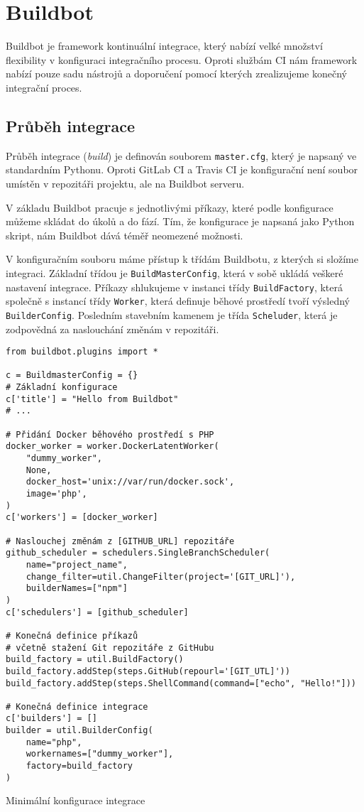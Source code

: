 \chapter{Buildbot}

Buildbot je framework kontinuální integrace, který nabízí velké množství flexibility v konfiguraci integračního procesu.
Oproti službám CI nám framework nabízí pouze sadu nástrojů a doporučení pomocí kterých zrealizujeme konečný integrační proces.

\section{Průběh integrace}

Průběh integrace (\textit{build}) je definován souborem \verb|master.cfg|, který je napsaný ve standardním Pythonu.
Oproti GitLab CI a Travis CI je konfigurační není soubor umístěn v repozitáři projektu, ale na Buildbot serveru.

V základu Buildbot pracuje s jednotlivými příkazy, které podle konfigurace můžeme skládat do úkolů a do fází.
Tím, že konfigurace je napsaná jako Python skript, nám Buildbot dává téměř neomezené možnosti.

V konfiguračním souboru máme přístup k třídám Buildbotu, z kterých si složíme integraci.
Základní třídou je \verb|BuildMasterConfig|, která v sobě ukládá veškeré nastavení integrace.
Příkazy shlukujeme v instanci třídy \verb|BuildFactory|, která společně s instancí třídy \verb|Worker|, která definuje běhové prostředí tvoří výsledný \verb|BuilderConfig|.
Posledním stavebním kamenem je třída \verb|Scheluder|, která je zodpovědná za naslouchání změnám v repozitáři.

\begin{listing}[ht]
\begin{verbatim}
from buildbot.plugins import *

c = BuildmasterConfig = {}
# Základní konfigurace
c['title'] = "Hello from Buildbot"
# ...

# Přidání Docker běhového prostředí s PHP
docker_worker = worker.DockerLatentWorker(
    "dummy_worker",
    None,
    docker_host='unix://var/run/docker.sock',
    image='php',
)
c['workers'] = [docker_worker]

# Naslouchej změnám z [GITHUB_URL] repozitáře
github_scheduler = schedulers.SingleBranchScheduler(
    name="project_name",
    change_filter=util.ChangeFilter(project='[GIT_URL]'),
    builderNames=["npm"]
)
c['schedulers'] = [github_scheduler]

# Konečná definice příkazů
# včetně stažení Git repozitáře z GitHubu
build_factory = util.BuildFactory()
build_factory.addStep(steps.GitHub(repourl='[GIT_UTL]'))
build_factory.addStep(steps.ShellCommand(command=["echo", "Hello!"]))

# Konečná definice integrace
c['builders'] = []
builder = util.BuilderConfig(
    name="php",
    workernames=["dummy_worker"],
    factory=build_factory
)

\end{verbatim}
\caption{Minimální konfigurace integrace}
\end{listing}